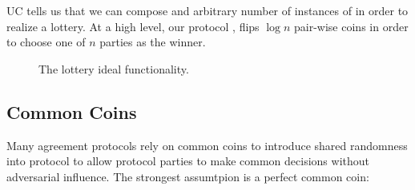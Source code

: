 UC tells us that we can compose and arbitrary number of instances of \Fflip in order to realize a lottery.
At a high level, our protocol , flips $\log n$ pair-wise coins in order to choose one of $n$ parties as the winner. 

\begin{figure}
\centering

\caption{The lottery ideal functionality.}
\label{fig:flotto}
\end{figure}


\subsection{Common Coins}
Many agreement protocols rely on common coins to introduce shared randomness into protocol to allow protocol parties to make common decisions without adversarial influence.
The strongest assumtpion is a perfect common coin: 
